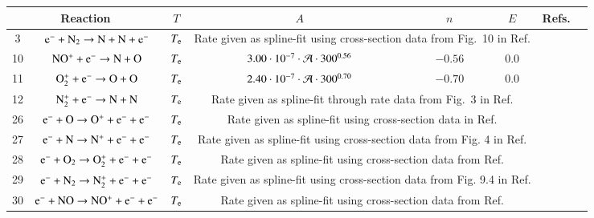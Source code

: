 \documentclass{warpdoc}
\renewcommand{\fontsizetable}{\footnotesize\scalefont{0.9}}
\begin{document}
\begin{table}[t]
\fontsizetable
\begin{center}
\begin{threeparttable}
\begin{tabular}{cccccccc} 
\toprule

\multicolumn{2}{c}{Reaction} & $T$ & $A$ & $n$ & $E$ & \multicolumn{1}{c}{Refs.}\\ 
\midrule                

3 & $\rm e^{-} +N_2\rightarrow N + N + e^{-}$ &$T_{\rm e}$ & \multicolumn{3}{p{8cm}}{Rate given as spline-fit using cross-section data from Fig.~10 in Ref. \cite{pr:1985;:phelps}} & \cite{pr:1985;:phelps} \\                      
10 & $\rm NO^{+} + e^- \rightarrow  N + O $  &$T_{\rm e}$ & $3.00 \cdot 10^{-7} \cdot {\cal A} \cdot300^{0.56}$ & $-0.56$ & $0.0$ & \cite{jgr:2004:sheehan} \\
11 & $\rm  O_2^{+}+e^- \rightarrow  O + O $ &$T_{\rm e}$ & $2.40 \cdot 10^{-7} \cdot {\cal A}\cdot300^{0.70} $ & $-0.70$ & $0.0$ & \cite{aip:2001:peverall} \\
12 & $\rm N_2^{+}+e^-\rightarrow N + N $  &$T_{\rm e}$ &  \multicolumn{3}{p{8cm}}{Rate given as spline-fit through rate data from Fig.~3 in Ref. \cite{aip:1998:peterson}} & \cite{aip:1998:peterson} \\                                   
26 & $\rm e^- + O \rightarrow O^{+}+e^- + e^-$ &$T_{\rm e}$ & \multicolumn{3}{p{8cm}}{Rate given as spline-fit using cross-section data in Ref. \cite{pcpp:1992:morgan}}  &\cite{pcpp:1992:morgan}\\
27 & $\rm e^- + N \rightarrow N^{+}+e^- + e^-$ &$T_{\rm e}$ & \multicolumn{3}{p{8cm}}{Rate given as spline-fit using cross-section data from Fig. 4 in Ref. \cite{pr:1962:smith}} &\cite{pr:1962:smith}\\                                        
28  & $\rm e^- + O_2   \rightarrow O_2^+ + e^- + e^-$  &$T_{\rm e}$ &  \multicolumn{3}{p{8cm}}{Rate given as spline-fit using cross-section data from Ref. \cite{pcpp:1992:morgan}} & \cite{pcpp:1992:morgan} \\
29  & $\rm e^- + N_2   \rightarrow N_2^+ + e^- + e^-$   &$T_{\rm e}$ &  \multicolumn{3}{p{8cm}}{Rate given as spline-fit using cross-section data from Fig. 9.4 in Ref. \cite{aip:1986:itikawa}} & \cite{aip:1986:itikawa} \\
30 & $\rm e^- + NO  \rightarrow NO^+ + e^- + e^-$  &$T_{\rm e}$ &  \multicolumn{3}{p{8cm}}{Rate given as spline-fit using cross-section data from Ref. \cite{pcpp:1992:morgan}} & \cite{pcpp:1992:morgan} \\


\end{tabular}
\end{threeparttable}
\end{center}
\end{table}
\end{document}
